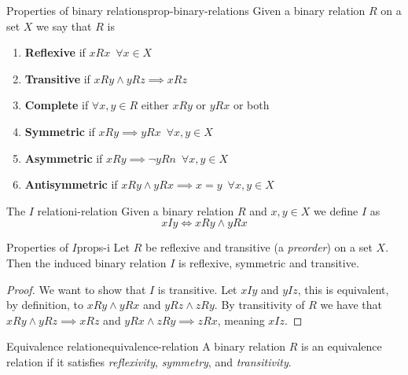 \documentclass[12pt]{extarticle}
\begin{document}
\begin{proposition}{Properties of binary relations}{prop-binary-relations}
    Given a binary relation $R$ on a set $X$ we say that $R$ is
    \begin{enumerate}[label=\roman*.]
        \item \textbf{Reflexive} if $xRx \enspace \forall x \in X$
        \item \textbf{Transitive} if $xRy \land yRz \implies xRz$
        \item \textbf{Complete} if $\forall x, y \in R$ either $xRy$ or $yRx$ or both
        \item \textbf{Symmetric} if $xRy \implies yRx \enspace \forall x,y \in X$
        \item \textbf{Asymmetric} if $xRy \implies \lnot yRn \enspace \forall x,y \in X$
        \item \textbf{Antisymmetric} if $xRy \land yRx \implies x = y \enspace \forall x,y \in X$
    \end{enumerate}
\end{proposition}

\begin{definition}{The $I$ relation}{i-relation}
    Given a binary relation $R$ and $x, y \in X$ we define $I$ as
    \begin{equation}
        xIy \iff xRy \land yRx
    \end{equation}
\end{definition}

\begin{proposition}{Properties of $I$}{props-i}
    Let $R$ be reflexive and transitive (a \textit{preorder}) on a set $X$.
    Then the induced binary relation $I$ is reflexive, symmetric and transitive.
\end{proposition}

\begin{proof}
    We want to show that $I$ is transitive.
    Let $xIy$ and $yIz$, this is equivalent, by definition, to $xRy \land yRx$ and $yRz \land zRy$.
    By transitivity of $R$ we have that $xRy \land yRz \implies xRz$ and $yRx \land zRy \implies zRx$, meaning $xIz$.
\end{proof}

\begin{definition}{Equivalence relation}{equivalence-relation}
    A binary relation $R$ is an equivalence relation if it satisfies \textit{reflexivity}, \textit{symmetry}, and \textit{transitivity}.
\end{definition}
\end{document}
